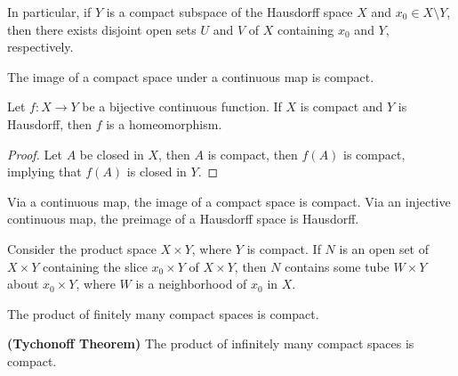 \documentclass[12pt,a4paper]{article}
\begin{document}
    \begin{lemma}\label{3.4.6}
        In particular, if $Y$ is a compact subspace of the Hausdorff space $X$ and $x_0\in X\setminus Y$, then there exists disjoint open sets $U$ and $V$ of $X$ containing $x_0$ and $Y$, respectively.
    \end{lemma}
    \hfill

    \begin{thm}
        The image of a compact space under a continuous map is compact.
    \end{thm}
    \hfill

    \begin{thm}
        Let $f:X\to Y$ be a bijective continuous function. If $X$ is compact and $Y$ is Hausdorff, then $f$ is a homeomorphism.
    \end{thm}
    \begin{proof}
        Let $A$ be closed in $X$, then $A$ is compact, then $f(A)$ is compact, implying that $f(A)$ is closed in $Y$.
    \end{proof}
    \begin{remark}
        Via a continuous map, the image of a compact space is compact. Via an injective continuous map, the preimage of a Hausdorff space is Hausdorff.
    \end{remark}
    \hfill

    \begin{lemma}\label{3.4.9}
        Consider the product space $X\times Y$, where $Y$ is compact. If $N$ is an open set of $X\times Y$ containing the slice $x_0\times Y$ of $X\times Y$, then $N$ contains some tube $W\times Y$ about $x_0\times Y$, where $W$ is a neighborhood of $x_0$ in $X$.
    \end{lemma}
    \begin{thm}
        The product of finitely many compact spaces is compact.
    \end{thm}
    \begin{remark}\textbf{(Tychonoff Theorem)} 
        The product of infinitely many compact spaces is compact.
    \end{remark}
    \hfill
\end{document}
